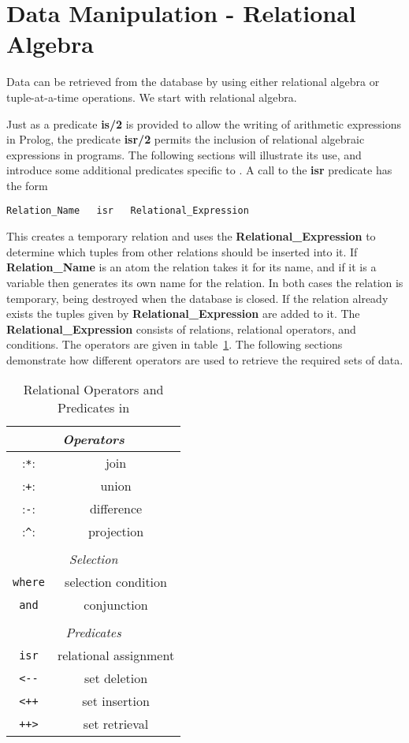 \section{Data Manipulation - Relational Algebra}
\label{alg1}
Data can be retrieved from the database by using either
relational algebra or tuple-at-a-time operations.  We start
with relational algebra.

\label{isr}
Just as a predicate {\bf is/2} is provided to allow the writing of arithmetic 
expressions in Prolog, the predicate {\bf isr/2} 
permits the inclusion of relational algebraic 
expressions in \eclipse programs.  
The following sections will illustrate
its use, and introduce some additional predicates specific to \eclipse.
A call to the {\bf isr} predicate has the form
\begin{verbatim}
Relation_Name   isr   Relational_Expression
\end{verbatim}

This creates a temporary relation and uses the {\bf Relational\_Expression}
to determine which tuples from other relations should be inserted into it. 
If {\bf Relation\_Name} is an atom the relation takes it for its name, 
and if it is a variable then \eclipse generates its own name for the relation.  
In both cases the relation is temporary, being destroyed when the database 
is closed. If the relation already exists the tuples given by
{\bf Relational\_Expression} are added to it.
The {\bf Relational\_Expression} consists of relations, relational operators, 
and conditions.  The operators are given in table~\ref{ops}.
The following sections demonstrate how different operators are used
to retrieve the required sets of data.

\begin{table}
\centering
\begin{tabular}{||c|c||}        
 \multicolumn{2}{c}{\em Operators}  \\ \hline
 :\verb+*+: & join \\
 :\verb-+-: & union  \\
 :\verb+-+: & difference  \\
 :\verb+^+: & projection   \\ \hline
 \multicolumn{2}{c}{ } \\
 \multicolumn{2}{c}{\em Selection}  \\ \hline
 \verb-where- & selection condition \\
 \verb-and- & conjunction \\  \hline
 \multicolumn{2}{c}{ } \\
 \multicolumn{2}{c}{\em Predicates}  \\ \hline
 \verb+isr+ & relational assignment \\
 \verb+<--+ & set deletion \\
 \verb-<++- & set insertion \\
 \verb-++>- & set retrieval  \\ \hline
\end{tabular}
\caption{ Relational Operators and Predicates in \eclipse}
\label{ops}
\end{table}

